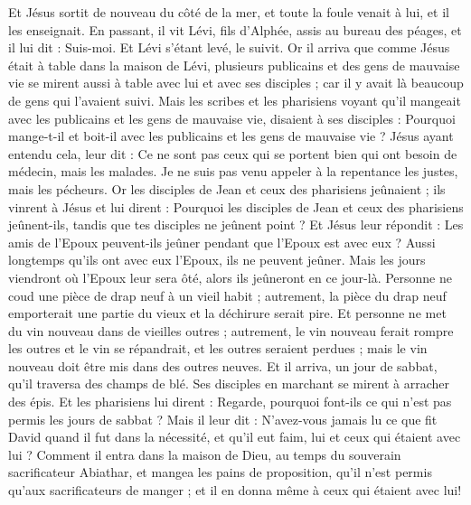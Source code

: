 \begin{multicols}{2}
Et Jésus sortit de nouveau du côté de la mer, et toute la foule venait à lui, et il les enseignait.
En passant, il vit Lévi, fils d'Alphée, assis au bureau des péages, et il lui dit : Suis-moi. Et Lévi s'étant levé, le suivit.
Or il arriva que comme Jésus était à table dans la maison de Lévi, plusieurs publicains et des gens de mauvaise vie se mirent aussi à table avec lui et avec ses disciples ; car il y avait là beaucoup de gens qui l'avaient suivi.
Mais les scribes et les pharisiens voyant qu'il mangeait avec les publicains et les gens de mauvaise vie, disaient à ses disciples : Pourquoi mange-t-il et boit-il avec les publicains et les gens de mauvaise vie ?
Jésus ayant entendu cela, leur dit : Ce ne sont pas ceux qui se portent bien qui ont besoin de médecin, mais les malades. Je ne suis pas venu appeler à la repentance les justes, mais les pécheurs.
Or les disciples de Jean et ceux des pharisiens jeûnaient ; ils vinrent à Jésus et lui dirent : Pourquoi les disciples de Jean et ceux des pharisiens jeûnent-ils, tandis que tes disciples ne jeûnent point ?
Et Jésus leur répondit : Les amis de l'Epoux peuvent-ils jeûner pendant que l'Epoux est avec eux ? Aussi longtemps qu'ils ont avec eux l'Epoux, ils ne peuvent jeûner.
Mais les jours viendront où l'Epoux leur sera ôté, alors ils jeûneront en ce jour-là.
Personne ne coud une pièce de drap neuf à un vieil habit ; autrement, la pièce du drap neuf emporterait une partie du vieux et la déchirure serait pire.
Et personne ne met du vin nouveau dans de vieilles outres ; autrement, le vin nouveau ferait rompre les outres et le vin se répandrait, et les outres seraient perdues ; mais le vin nouveau doit être mis dans des outres neuves.
Et il arriva, un jour de sabbat, qu'il traversa des champs de blé. Ses disciples en marchant se mirent à arracher des épis.
Et les pharisiens lui dirent : Regarde, pourquoi font-ils ce qui n'est pas permis les jours de sabbat ?
Mais il leur dit : N'avez-vous jamais lu ce que fit David quand il fut dans la nécessité, et qu'il eut faim, lui et ceux qui étaient avec lui ?
Comment il entra dans la maison de Dieu, au temps du souverain sacrificateur Abiathar, et mangea les pains de proposition, qu'il n'est permis qu'aux sacrificateurs de manger ; et il en donna même à ceux qui étaient avec lui!

\end{multicols}
